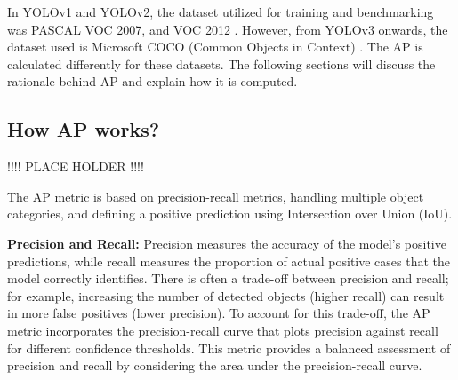 \documentclass{article}
\begin{document}
In YOLOv1 and YOLOv2, the dataset utilized for training and benchmarking was PASCAL VOC 2007, and VOC 2012 \cite{everingham2010pascal}. However, from YOLOv3 onwards, the dataset used is Microsoft COCO (Common Objects in Context) \cite{COCO}. The AP is calculated differently for these datasets. The following sections will discuss the rationale behind AP and explain how it is computed.


\subsection{How AP works?}

!!!! PLACE HOLDER !!!!



The AP metric is based on precision-recall metrics, handling multiple object categories, and defining a positive prediction using Intersection over Union (IoU).

\textbf{Precision and Recall:} Precision measures the accuracy of the model’s positive predictions, while recall measures the proportion of actual positive cases that the model correctly identifies. There is often a trade-off between precision and recall; for example, increasing the number of detected objects (higher recall) can result in more false positives (lower precision). To account for this trade-off, the AP metric incorporates the precision-recall curve that plots precision against recall for different confidence thresholds. This metric provides a balanced assessment of precision and recall by considering the area under the precision-recall curve.
\end{document}
